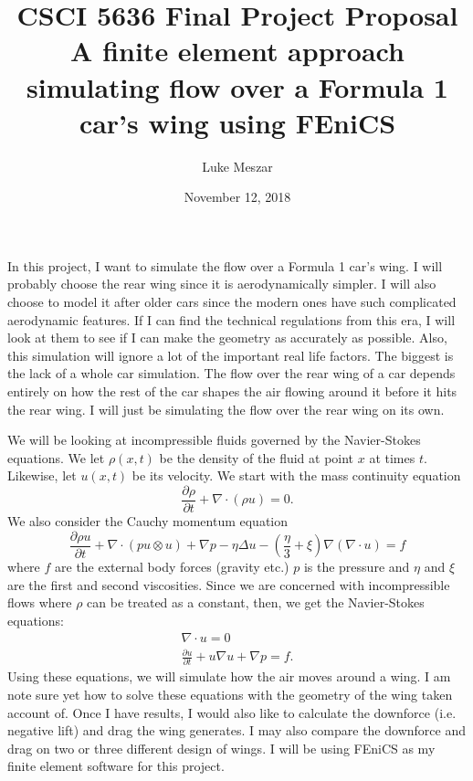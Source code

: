 \documentclass[12pt]{article}
\title{CSCI 5636 Final Project Proposal \\
\large A finite element approach simulating flow over a Formula 1 car's wing using FEniCS}
\author{Luke Meszar}
\date{November 12, 2018}
\theoremstyle{definition}
\numberwithin{equation}{section}
\begin{document}
	\maketitle
	In this project, I want to simulate the flow over a Formula 1 car's wing. I will probably choose the rear wing since it is aerodynamically simpler. I will also choose to model it after older cars since the modern ones have such complicated aerodynamic features. If I can find the technical regulations from this era, I will look at them to see if I can make the geometry as accurately as possible. Also, this simulation will ignore a lot of the important real life factors. The biggest is the lack of a whole car simulation. The flow over the rear wing of a car depends entirely on how the rest of the car shapes the air flowing around it before it hits the rear wing. I will just be simulating the flow over the rear wing on its own.
	
	We will be looking at incompressible fluids governed by the Navier-Stokes equations. We let $\rho(x,t)$ be the density of the fluid at point $x$ at times $t$. Likewise, let $u(x,t)$ be its velocity. We start with the mass continuity equation
	\[\frac{\partial \rho}{\partial t}+\nabla \cdot (\rho u) = 0.\]
	We also consider the Cauchy momentum equation 
	\[\frac{\partial \rho u}{\partial t} + \nabla \cdot (pu \otimes u) + \nabla p - \eta \Delta u - \left(\frac{\eta}{3}+\xi\right)\nabla(\nabla\cdot u) = f\]
	where $f$ are the external body forces (gravity etc.) $p$ is the pressure and $\eta$ and $\xi$ are the first and second viscosities. Since we are concerned with incompressible flows where $\rho$ can be treated as a constant, then, we get the Navier-Stokes equations:
	\begin{gather*}
	\nabla \cdot u = 0 \\
	\frac{\partial u}{\partial t} + u\nabla u + \nabla p = f.
	\end{gather*}
	Using these equations, we will simulate how the air moves around a wing. I am note sure yet how to solve these equations with the geometry of the wing taken account of. Once I have results, I would also like to calculate the downforce (i.e. negative lift) and drag the wing generates. I may also compare the downforce and drag on two or three different design of wings. I will be using FEniCS as my finite element software for this project. 
\end{document}

